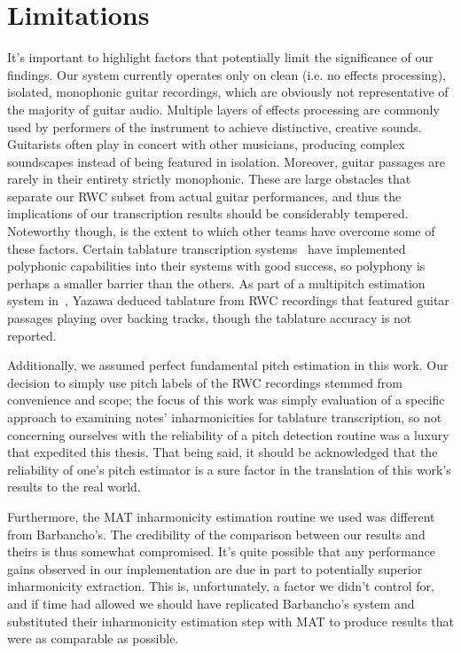 \documentclass[12pt]{cmuthesis}
\begin{document}
\section{Limitations}
It's important to highlight factors that potentially limit the significance of our findings. Our system currently operates only on clean (i.e. no effects processing), isolated, monophonic guitar recordings, which are obviously not representative of the majority of guitar audio. Multiple layers of effects processing are commonly used by performers of the instrument to achieve distinctive, creative sounds. Guitarists often play in concert with other musicians, producing complex soundscapes instead of being featured in isolation. Moreover, guitar passages are rarely in their entirety strictly monophonic. These are large obstacles that separate our RWC subset from actual guitar performances, and thus the implications of our transcription results should be considerably tempered. Noteworthy though, is the extent to which other teams have overcome some of these factors. Certain tablature transcription systems~\cite{barbanchoi2012,abesser2012,dittmar2013,kehling2014} have implemented polyphonic capabilities into their systems with good success, so polyphony is perhaps a smaller barrier than the others. As part of a multipitch estimation system in~\cite{yazawa2013}, Yazawa deduced tablature from RWC recordings that featured guitar passages playing over backing tracks, though the tablature accuracy is not reported.

Additionally, we assumed perfect fundamental pitch estimation in this work. Our decision to simply use pitch labels of the RWC recordings stemmed from convenience and scope; the focus of this work was simply evaluation of a specific approach to examining notes' inharmonicities for tablature transcription, so not concerning ourselves with the reliability of a pitch detection routine was a luxury that expedited this thesis. That being said, it should be acknowledged that the reliability of one's pitch estimator is a sure factor in the translation of this work's results to the real world.

Furthermore, the MAT inharmonicity estimation routine we used was different from Barbancho's. The credibility of the comparison between our results and theirs is thus somewhat compromised. It's quite possible that any performance gains observed in our implementation are due in part to potentially superior inharmonicity extraction. This is, unfortunately, a factor we didn't control for, and if time had allowed we should have replicated Barbancho's system and substituted their inharmonicity estimation step with MAT to produce results that were as comparable as possible.
\end{document}

